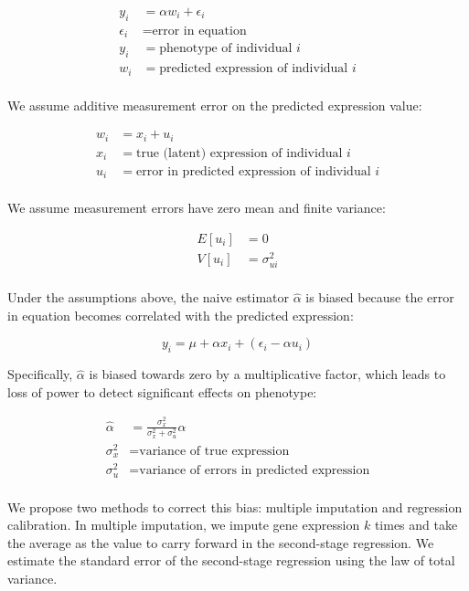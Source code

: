 \documentclass{article}
\begin{document}
\begin{align*}
  y_i &= \alpha w_i + \epsilon_i\\
  \epsilon_i &= \text{error in equation}\\
  y_i &= \text{phenotype of individual $i$}\\
  w_i &= \text{predicted expression of individual $i$}\\
\end{align*}

We assume additive measurement error on the predicted expression value:

\begin{align*}
  w_i &= x_i + u_i\\
  x_i &= \text{true (latent) expression of individual $i$}\\
  u_i &= \text{error in predicted expression of individual $i$}\\
\end{align*}

We assume measurement errors have zero mean and finite variance:

\begin{align*}
  E[u_i] &= 0\\
  V[u_i] &= \sigma_{ui}^2\\
\end{align*}

Under the assumptions above, the naive estimator $\hat\alpha$ is biased because
the error in equation becomes correlated with the predicted expression:

\begin{equation}
  y_i = \mu + \alpha x_i + (\epsilon_i - \alpha u_i)
\end{equation}

Specifically, $\hat\alpha$ is biased towards zero by a multiplicative factor,
which leads to loss of power to detect significant effects on phenotype:

\begin{align*}
  \hat\alpha &= \frac{\sigma_x^2}{\sigma_x^2 + \sigma_u^2}\alpha\\
  \sigma_x^2 &= \text{variance of true expression}\\
  \sigma_u^2 &= \text{variance of errors in predicted expression}\\
\end{align*}

We propose two methods to correct this bias: multiple imputation and regression
calibration. In multiple imputation, we impute gene expression $k$ times and
take the average as the value to carry forward in the second-stage regression.
We estimate the standard error of the second-stage regression using the law of
total variance.
\end{document}

